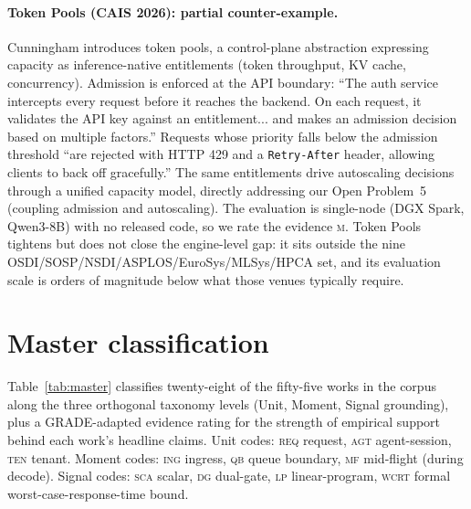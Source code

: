 \paragraph{Token Pools (CAIS 2026): partial counter-example.}
Cunningham \citep{cunningham2026tokenpools} introduces token pools, a
control-plane abstraction expressing capacity as inference-native
entitlements (token throughput, KV cache, concurrency). Admission is
enforced at the API boundary: ``The auth service intercepts every
request before it reaches the backend. On each request, it validates
the API key against an entitlement... and makes an admission decision
based on multiple factors.'' Requests whose priority falls below the
admission threshold ``are rejected with HTTP 429 and a
\texttt{Retry-After} header, allowing clients to back off gracefully.'' The same entitlements drive autoscaling
decisions through a unified capacity model, directly addressing our
Open Problem~5 (coupling admission and autoscaling). The evaluation
is single-node (DGX Spark, Qwen3-8B) with no released code, so we
rate the evidence \textsc{m}. Token Pools tightens but does not close
the engine-level gap: it sits outside the nine
OSDI/SOSP/NSDI/ASPLOS/EuroSys/MLSys/HPCA set, and its evaluation
scale is orders of magnitude below what those venues typically
require.

\section{Master classification}
\label{sec:master}

Table~\ref{tab:master} classifies twenty-eight of the fifty-five works
in the corpus along the three orthogonal
taxonomy levels (Unit, Moment, Signal grounding), plus a
GRADE-adapted evidence rating for the strength of empirical support
behind each work's headline claims. Unit codes: \textsc{req} request,
\textsc{agt} agent-session, \textsc{ten} tenant. Moment codes:
\textsc{ing} ingress, \textsc{qb} queue boundary, \textsc{mf}
mid-flight (during decode). Signal codes: \textsc{sca} scalar,
\textsc{dg} dual-gate, \textsc{lp} linear-program, \textsc{wcrt}
formal worst-case-response-time bound.

